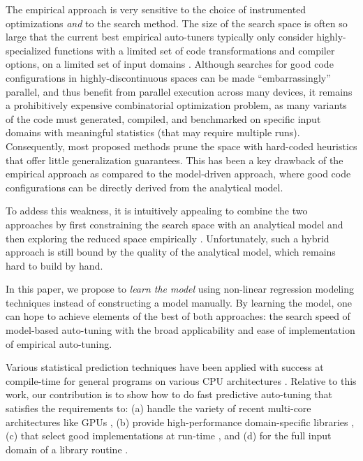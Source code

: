 \documentclass{sig-alternate}
\begin{document}

The empirical approach is very sensitive to the choice of instrumented
optimizations \emph{and} to the search method. The size of the search space is
often so large that the current best empirical auto-tuners typically only consider
highly-specialized functions with a limited set of code transformations and
compiler options, on a limited set of input domains \citep{ganapathi2009case}. Although
searches for good code configurations in highly-discontinuous spaces can
be made ``embarrassingly'' parallel, and thus benefit from parallel execution across many devices, it remains a prohibitively
expensive combinatorial optimization problem, as many variants of the code must
generated, compiled, and benchmarked on specific input domains with meaningful
statistics (that may require multiple runs). Consequently, most proposed
methods prune the space with hard-coded heuristics that offer little
generalization guarantees. This has been a key drawback of the empirical
approach as compared to the model-driven approach, where good code configurations
can be directly derived from the analytical model.


To addess this weakness, it is intuitively appealing to combine the two
approaches by first constraining the search space with an analytical model and
then exploring the reduced space empirically \citep{chen2005combining,
li2009note}. Unfortunately, such a hybrid approach is still bound by the quality
of the analytical model, which remains hard to build by hand.


In this paper, we propose to \emph{learn the model} using non-linear regression
modeling techniques instead of constructing a model manually. By learning the model, one can
hope to achieve elements of the best of both approaches: the search speed of model-based auto-tuning with the broad applicability
and ease of implementation of empirical auto-tuning.

Various statistical prediction techniques have been applied with
success at compile-time for general programs on various CPU architectures
\citep{monsifrot2002machine, stephenson2003meta, yotov2003comparison,
kulkarni2004fast, cooper2005acme, franke2005probabilistic,
hutter2006performance, cavazos2007rapidly, cavazos2008intelligent,
hartono2009annotation, park2011evaluation, fursin2008milepost}.
Relative to this work, our contribution is to show
how to do fast predictive auto-tuning that satisfies the requirements to:
(a) handle the variety of recent multi-core architectures like GPUs \citep{schaa2009exploring},
(b) provide high-performance domain-specific libraries \citep{nukada2009auto, li2009note, kamil2010auto},
(c) that select good implementations at run-time \citep{klockner2011pycuda, pinto+cox:2011gcg}, and
(d) for the full input domain of a library routine \citep{liu2009cross, grauer2011optimizing}.
\end{document}
